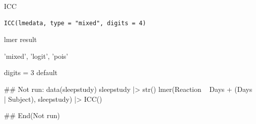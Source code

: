 \documentclass[a4paper]{book}
\begin{document}
%
\begin{Description}
ICC
\end{Description}
%
\begin{Usage}
\begin{verbatim}
ICC(lmedata, type = "mixed", digits = 4)
\end{verbatim}
\end{Usage}
%
\begin{Arguments}
\begin{ldescription}
\item[\code{lmedata}] lmer result

\item[\code{type}] 'mixed', 'logit', 'pois'

\item[\code{digits}] digits = 3 default
\end{ldescription}
\end{Arguments}
%
\begin{Examples}
\begin{ExampleCode}
\#\# Not run: 
data(sleepstudy)
sleepstudy |> str()
lmer(Reaction ~ Days + (Days | Subject), sleepstudy) |> ICC()



## End(Not run)
\end{ExampleCode}
\end{Examples}
\end{document}
